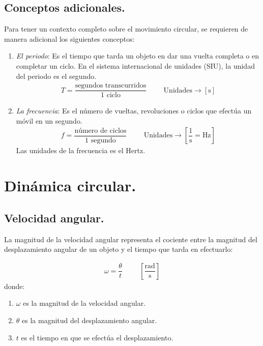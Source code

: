 \documentclass[12pt]{article}
\begin{document}
\subsection{Conceptos adicionales.}

Para tener un contexto completo sobre el movimiento circular, se requieren de manera adicional los siguientes conceptos:
\begin{enumerate}
\item \textit{El periodo}: Es el tiempo que tarda un objeto en dar una vuelta completa o en completar un ciclo. En el sistema internacional de unidades (SIU), la unidad del periodo es el segundo.
\begin{align*}
T = \dfrac{\text{segundos transcurridos}}{\text{1 ciclo}} \hspace{1cm} \text{Unidades} \rightarrow \left[ \unit{\second} \right]
\end{align*}
\item \textit{La frecuencia}: Es el número de vueltas, revoluciones o ciclos que efectúa un móvil en un segundo.
\begin{align*}
f = \dfrac{\text{número de ciclos}}{\text{1 segundo}} \hspace{1cm} \text{Unidades} \rightarrow \left[ \dfrac{1}{\unit{\second}} = \si{\hertz} \right]
\end{align*}
Las unidades de la frecuencia es el Hertz.
\end{enumerate}
    
\section{Dinámica circular.}

\subsection{Velocidad angular.}

La magnitud de la velocidad angular representa el cociente entre la magnitud del desplazamiento angular de un objeto y el tiempo que tarda en efectuarlo:

\begin{align*}
\omega = \dfrac{\theta}{t} \hspace{1cm} \left[ \dfrac{\text{rad}}{\unit{\second}} \right]
\end{align*}
donde:
\begin{enumerate}[label=\alph*)]
\item $\omega$ es la magnitud de la velocidad angular.
\item $\theta$ es la magnitud del desplazamiento angular.
\item $t$ es el tiempo en que se efectúa el desplazamiento.
\end{enumerate}
\end{document}
